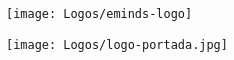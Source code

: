 \begin{figure}[t]
	\begin{flushleft}
		\texttt{[image: Logos/eminds-logo]}
	\end{flushleft}
\end{figure}

\vspace*{20mm}

\begin{figure}[h]
	\begin{center}
		\texttt{[image: Logos/logo-portada.jpg]}
	\end{center}
\end{figure}

\vspace*{37mm}




